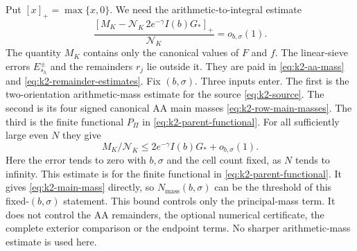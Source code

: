 Put \([x]_+=\max\{x,0\}\).
We need the arithmetic-to-integral estimate
\begin{equation}\label{eq:k2-main-mass}
 \frac{[M_K-\mathcal N_K\,2e^{-\gamma}I(b)G_*]_+}
      {\mathcal N_K}=o_{b,\sigma}(1).
\end{equation}
The quantity \(M_K\) contains only the canonical values of \(F\) and
\(f\). The linear-sieve errors \(E^{\pm}_{s_h}\) and the remainders
\(r_j\) lie outside it. They are paid in
\eqref{eq:k2-aa-mass} and \eqref{eq:k2-remainder-estimates}. Fix
\((b,\sigma)\). Three inputs enter. The first is the two-orientation
arithmetic-mass estimate for the source \eqref{eq:k2-source}. The second
is its four signed canonical AA
main masses \eqref{eq:k2-row-main-masses}. The third is the finite functional
\(P_\Pi\) in \eqref{eq:k2-parent-functional}. For all sufficiently
large even \(N\) they give
\[
 M_K/\mathcal N_K\le2e^{-\gamma}I(b)G_*+o_{b,\sigma}(1).
\]
Here the error tends to zero with \(b,\sigma\) and the cell count fixed,
as \(N\) tends to infinity. This estimate is for the finite functional in
\eqref{eq:k2-parent-functional}. It gives
\eqref{eq:k2-main-mass} directly, so
\(N_{\mathrm{mass}}(b,\sigma)\) can be the threshold of
this fixed-\((b,\sigma)\) statement. This bound controls only the
principal-mass term. It does not control the AA remainders, the optional
numerical certificate, the complete exterior comparison or
the endpoint terms. No sharper arithmetic-mass estimate is used here.


